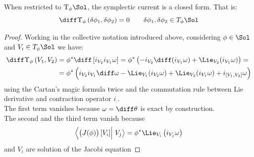 \documentclass[a4paper,12pt]{scrartcl}  %
\begin{document}
\begin{proposition}\label{Prop:CurrentClosed}
	When restricted to $\textrm{T}_\phi \Sol$, the symplectic current is a closed form. That is:
	\begin{displaymath}
		\diff \Upsilon_\phi \left( \delta \phi_1 , \delta \phi_2 \right) = 0 \qquad \delta \phi_1 , \delta \phi_2 \in T_\phi \Sol
	\end{displaymath}
\end{proposition}
\begin{proof}
	Working in the collective notation introduced above, considering $\phi \in \Sol$ and $V_i \in T_\phi \Sol$  we have:
	\begin{align*}
		\diff \Upsilon_\phi \left( V_1 , V_2 \right) &= 
		\phi^\ast \diff \left[ i_{V_2} i_{V_1} \omega \right] = 
		\phi^\ast \left( - i_{V_2} \diff ( i_{V_1} \omega )  + \Lie_{V_2 } ( i_{V_1} \omega ) \right) =	\\
		&= \phi^\ast \left( 
			i_{V_2}i_{V_1} \diff \omega - 
			\Lie_{V_1 } ( i_{V_2} \omega ) +
			\Lie_{V_2 } ( i_{V_1} \omega ) +
			i_{[V_1,V_2]} \omega
		\right)
	\end{align*}
	using the Cartan's magic formula twice and the commutation rule between Lie derivative and contraction operator $i_\cdot$.\\
	The first term vanishes because $\omega= \diff \theta$ is exact by construction.\\
	The second and the third term vanish because
	\begin{displaymath}
		\left\langle \left( J(\phi) \right)[V_i] \right\vert \left. V_j \right\rangle = 
		\phi^\ast \Lie_{V_i} \left( i_{V_j} \omega \right)
	\end{displaymath}
	and $V_i$ are solution of the Jacobi equation
\end{proof}
\end{document}
